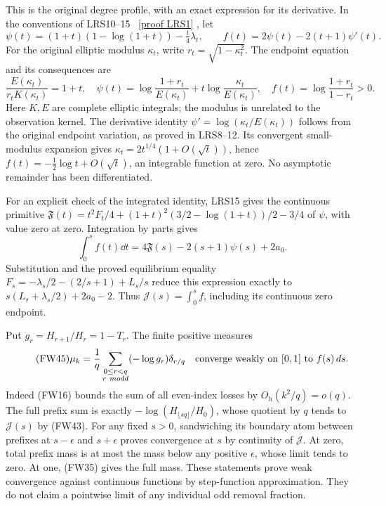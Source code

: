 \documentclass[11pt]{article}
\begin{document}
This is the original degree profile, with an exact expression for its
derivative. In the conventions of LRS10--15 \cite{lrs}%
~\href{https://github.com/KokunoYumeto/zeta-function-research-reader/blob/487253b5b01851da5b9b98af4e146fecf1fab902/workbenches/splitzero-tandem/continuations/20260919-full-window-source-products/providers/LRC_SCALAR_RECONSTRUCTION.tex\#L23}{[proof LRS1]}%
{}, let
\[
 \psi(t)=(1+t)(1-\log(1+t))-\tfrac t4\lambda_t,\qquad
 f(t)=2\psi(t)-2(t+1)\psi'(t).
\]
For the original elliptic modulus $\kappa_t$, write
$r_t=\sqrt{1-\kappa_t^2}$. The endpoint equation and its consequences are
\begin{equation}\tag{FW44}
 \frac{E(\kappa_t)}{r_tK(\kappa_t)}=1+t,\quad
 \psi(t)=\log\frac{1+r_t}{E(\kappa_t)}
                 +t\log\frac{\kappa_t}{E(\kappa_t)},\quad
 f(t)=\log\frac{1+r_t}{1-r_t}>0.
\end{equation}
Here $K,E$ are complete elliptic integrals; the modulus is unrelated to
the observation kernel. The derivative identity
$\psi'=\log(\kappa_t/E(\kappa_t))$ follows from the original endpoint
variation, as proved in LRS8--12. Its convergent small-modulus expansion
gives $\kappa_t=2t^{1/4}(1+O(\sqrt t))$, hence
$f(t)=-\tfrac12\log t+O(\sqrt t)$, an integrable function at zero.
No asymptotic remainder has been differentiated.

For an explicit check of the integrated identity, LRS15 gives the
continuous primitive
$\mathfrak F(t)=t^2F_t/4+(1+t)^2(3/2-\log(1+t))/2-3/4$
of $\psi$, with value zero at zero. Integration by parts gives
\[
 \int_0^s f(t)\dd t=4\mathfrak F(s)-2(s+1)\psi(s)+2a_0.
\]
Substitution and the proved equilibrium equality
$F_s=-\lambda_s/2-(2/s+1)+L_s/s$ reduce this expression exactly to
$s(L_s+\lambda_s/2)+2a_0-2$. Thus $\mathcal J(s)=\int_0^s f$,
including its continuous zero endpoint.

Put $g_r=H_{r+1}/H_r=1-T_r$. The finite positive measures
\begin{equation}\tag{FW45}
 \mu_k=\frac1q\sum_{\substack{0\le r<q\\r\ {
m odd}}}
              (-\log g_r)\delta_{r/q}
 \quad\hbox{converge weakly on $[0,1]$ to }f(s)\,d s.
\end{equation}
Indeed (FW16) bounds the sum of all even-index losses by
$O_h(k^2/q)=o(q)$. The full prefix sum is exactly
$-\log(H_{\lfloor sq\rfloor}/H_0)$, whose quotient by $q$ tends to
$\mathcal J(s)$ by (FW43). For any fixed $s>0$, sandwiching its boundary
atom between prefixes at $s-\epsilon$ and $s+\epsilon$ proves convergence
at $s$ by continuity of $\mathcal J$. At zero, total prefix mass is at
most the mass below any positive $\epsilon$, whose limit tends to zero.
At one, (FW35) gives the full mass. These statements prove weak convergence
against continuous functions by step-function approximation. They do not
claim a pointwise limit of any individual odd removal fraction.
\end{document}
